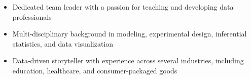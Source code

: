 \begin {cvparagraph}
\begin {itemize}
\itemsep-2mm
\vspace {1.0mm}
\item {Dedicated team leader with a passion for teaching and developing data professionals}
\item {Multi-disciplinary background in modeling, experimental design, inferential statistics, and data visualization}
\item {Data-driven storyteller with experience across several industries, including education, healthcare, and consumer-packaged goods}
\end {itemize}
\end {cvparagraph}
